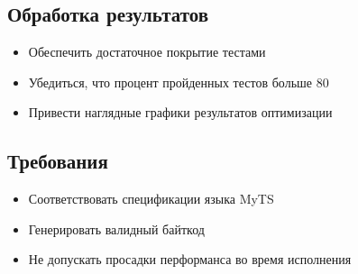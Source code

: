 \subsection{Обработка результатов}

\begin{itemize}[left=2em]
    \item Обеспечить достаточное покрытие тестами
    \item Убедиться, что процент пройденных тестов больше 80
    \item Привести наглядные графики результатов оптимизации
\end{itemize}

\subsection{Требования}

\begin{itemize}[left=2em]
    \item Соответствовать спецификации языка MyTS
    \item Генерировать валидный байткод
    \item Не допускать просадки перформанса во время исполнения
\end{itemize}

\newpage
